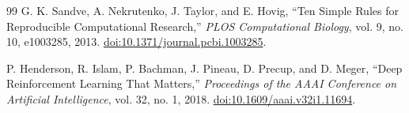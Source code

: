 \documentclass[12pt,a4paper,oneside]{book}
\theoremstyle{plain}
\numberwithin{equation}{chapter} \DeclareMathOperator{\Var}{Var}
\begin{document}
\begin{thebibliography}{99}
G. K. Sandve, A. Nekrutenko, J. Taylor, and E. Hovig, “Ten Simple Rules for Reproducible Computational Research,” \emph{PLOS Computational Biology}, vol. 9, no. 10, e1003285, 2013. \href{https://doi.org/10.1371/journal.pcbi.1003285}{doi:10.1371/journal.pcbi.1003285}.

P. Henderson, R. Islam, P. Bachman, J. Pineau, D. Precup, and D. Meger, “Deep Reinforcement Learning That Matters,” \emph{Proceedings of the AAAI Conference on Artificial Intelligence}, vol. 32, no. 1, 2018. \href{https://doi.org/10.1609/aaai.v32i1.11694}{doi:10.1609/aaai.v32i1.11694}.


\end{thebibliography}
\end{document}
